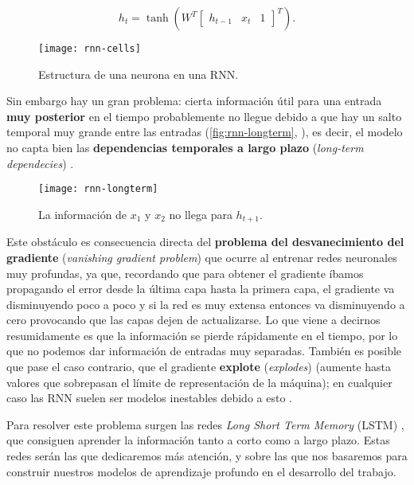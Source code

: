 \begin{equation}
  h_t = \tanh \left(W^T \begin{bmatrix} h_{t-1} & x_t & 1 \end{bmatrix}^T\right).
  \label{eq:rnn}
\end{equation}

\begin{figure}[htpb]
  \centering
  \texttt{[image: rnn-cells]}
  \caption{Estructura de una neurona en una RNN.}
  \label{fig:rnn-cells}
\end{figure}

Sin embargo hay un gran problema: cierta información útil para una entrada \textbf{muy posterior} en el tiempo probablemente no llegue debido a que hay un salto temporal muy grande entre las entradas (\autoref{fig:rnn-longterm}, \cite{christopher2015lstm}), es decir, el modelo no capta bien las \textbf{dependencias temporales a largo plazo} (\emph{long-term dependecies}) \cite{bengio1994learning}.

\begin{figure}[htpb]
  \centering
  \texttt{[image: rnn-longterm]}
  \caption{La información de $x_1$ y $x_2$ no llega para $h_{t+1}$.}
  \label{fig:rnn-longterm}
\end{figure}

Este obstáculo es consecuencia directa del \textbf{problema del desvanecimiento del gradiente} (\emph{vanishing gradient problem}) que ocurre al entrenar redes neuronales muy profundas, ya que, recordando que para obtener el gradiente íbamos propagando el error desde la última capa hasta la primera capa, el gradiente va disminuyendo poco a poco y si la red es muy extensa entonces va disminuyendo a cero provocando que las capas dejen de actualizarse. Lo que viene a decirnos resumidamente es que la información se pierde rápidamente en el tiempo, por lo que no podemos dar información de entradas muy separadas. También es posible que pase el caso contrario, que el gradiente \textbf{explote} (\emph{explodes}) (aumente hasta valores que sobrepasan el límite de representación de la máquina); en cualquier caso las RNN suelen ser modelos inestables debido a esto \cite{Goodfellow-et-al-2016}.

Para resolver este problema surgen las redes \emph{Long Short Term Memory} (LSTM) \cite{hochreiter1997long}, que consiguen aprender la información tanto a corto como a largo plazo. Estas redes serán las que dedicaremos más atención, y sobre las que nos basaremos para construir nuestros modelos de aprendizaje profundo en el desarrollo del trabajo.

